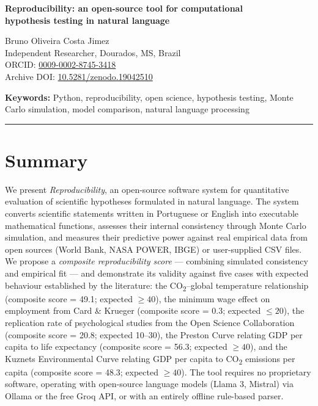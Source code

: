 \documentclass[12pt,a4paper]{article}
\begin{document}
\begin{center}
  {\LARGE\bfseries Reproducibility: an open-source tool for computational\\[4pt]
  hypothesis testing in natural language}

  \vspace{14pt}

  {\large Bruno Oliveira Costa Jimez}\\[4pt]
  {\small Independent Researcher, Dourados, MS, Brazil}\\[2pt]
  {\small ORCID: \href{https://orcid.org/0009-0002-8745-3418}{0009-0002-8745-3418}}\\[2pt]
  {\small Archive DOI: \href{https://doi.org/10.5281/zenodo.19042510}{10.5281/zenodo.19042510}}

  \vspace{6pt}
  {\small \textbf{Keywords:} Python, reproducibility, open science, hypothesis testing,
  Monte Carlo simulation, model comparison, natural language processing}
\end{center}

\hrule
\vspace{10pt}

\section*{Summary}

We present \textit{Reproducibility}, an open-source software system for quantitative
evaluation of scientific hypotheses formulated in natural language. The system
converts scientific statements written in Portuguese or English into executable
mathematical functions, assesses their internal consistency through Monte Carlo
simulation, and measures their predictive power against real empirical data
from open sources (World Bank, NASA POWER, IBGE) or user-supplied CSV files.
We propose a \textit{composite reproducibility score} --- combining simulated consistency
and empirical fit --- and demonstrate its validity against five cases with
expected behaviour established by the literature: the CO\textsubscript{2}--global temperature
relationship (composite score = 49.1; expected $\geq 40$), the minimum wage effect
on employment from Card \& Krueger (composite score = 0.3; expected $\leq 20$), the
replication rate of psychological studies from the Open Science Collaboration
(composite score = 20.8; expected 10--30), the Preston Curve relating GDP per
capita to life expectancy (composite score = 56.3; expected $\geq 40$), and the
Kuznets Environmental Curve relating GDP per capita to CO\textsubscript{2} emissions per capita
(composite score = 48.3; expected $\geq 40$). The tool requires no proprietary
software, operating with open-source language models (Llama 3, Mistral) via
Ollama or the free Groq API, or with an entirely offline rule-based parser.
\end{document}
